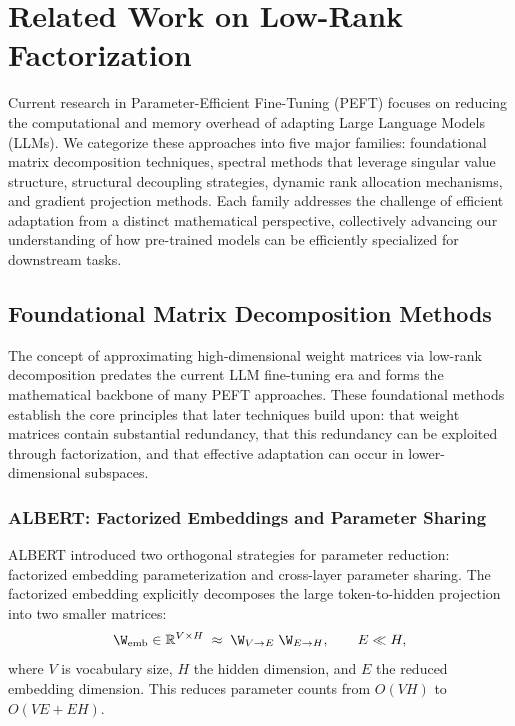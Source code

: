 

\section{Related Work on Low-Rank Factorization}
\label{sec:related_work}

Current research in Parameter-Efficient Fine-Tuning (PEFT) focuses on reducing the computational and memory overhead of adapting Large Language Models (LLMs). We categorize these approaches into five major families: foundational matrix decomposition techniques, spectral methods that leverage singular value structure, structural decoupling strategies, dynamic rank allocation mechanisms, and gradient projection methods. Each family addresses the challenge of efficient adaptation from a distinct mathematical perspective, collectively advancing our understanding of how pre-trained models can be efficiently specialized for downstream tasks.

\subsection{Foundational Matrix Decomposition Methods}
\label{subsec:foundations}

The concept of approximating high-dimensional weight matrices via low-rank decomposition predates the current LLM fine-tuning era and forms the mathematical backbone of many PEFT approaches. These foundational methods establish the core principles that later techniques build upon: that weight matrices contain substantial redundancy, that this redundancy can be exploited through factorization, and that effective adaptation can occur in lower-dimensional subspaces.

\subsubsection{ALBERT: Factorized Embeddings and Parameter Sharing}
\label{subsubsec:albert}

ALBERT introduced two orthogonal strategies for parameter reduction: factorized embedding parameterization and cross-layer parameter sharing. The factorized embedding explicitly decomposes the large token-to-hidden projection into two smaller matrices:
\begin{equation}
  \W_{\text{emb}} \in \mathbb{R}^{V \times H} \;\approx\; \W_{V\rightarrow E}\;\W_{E\rightarrow H}, \qquad E \ll H,
\end{equation}
where $V$ is vocabulary size, $H$ the hidden dimension, and $E$ the reduced embedding dimension. This reduces parameter counts from $O(VH)$ to $O(VE + EH)$.

